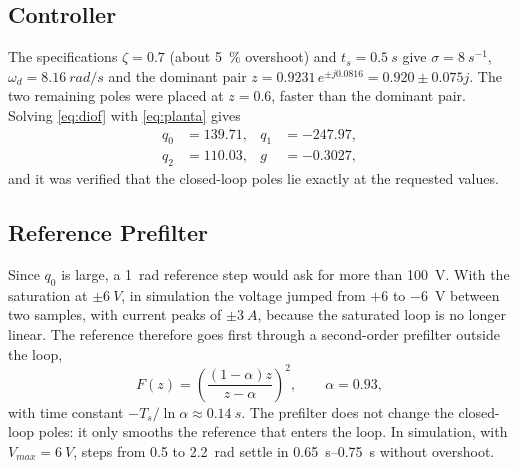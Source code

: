 \documentclass[conference,a4paper]{IEEEtran}
\begin{document}
\subsection{Controller}
The specifications $\zeta=0.7$ (about \SI{5}{\percent} overshoot) and $t_s=\SI{0.5}{s}$ give $\sigma=\SI{8}{s^{-1}}$, $\omega_d=\SI{8.16}{rad/s}$ and the dominant pair $z=0.9231\,e^{\pm j0.0816}=0.920\pm0.075j$. The two remaining poles were placed at $z=0.6$, faster than the dominant pair. Solving \eqref{eq:diof} with \eqref{eq:planta} gives
\begin{align}
q_0&=139.71, & q_1&=-247.97,\\
q_2&=110.03, & g&=-0.3027,
\end{align}
and it was verified that the closed-loop poles lie exactly at the requested values.

\subsection{Reference Prefilter}
Since $q_0$ is large, a \SI{1}{rad} reference step would ask for more than \SI{100}{V}. With the saturation at $\pm\SI{6}{V}$, in simulation the voltage jumped from $+6$ to \SI{-6}{V} between two samples, with current peaks of $\pm\SI{3}{A}$, because the saturated loop is no longer linear. The reference therefore goes first through a second-order prefilter outside the loop,
\begin{equation}
F(z)=\left(\frac{(1-\alpha)z}{z-\alpha}\right)^2,\qquad \alpha=0.93,
\end{equation}
with time constant $-T_s/\ln\alpha\approx\SI{0.14}{s}$. The prefilter does not change the closed-loop poles: it only smooths the reference that enters the loop. In simulation, with $V_{max}=\SI{6}{V}$, steps from 0.5 to \SI{2.2}{rad} settle in \SIrange{0.65}{0.75}{s} without overshoot.
\end{document}
